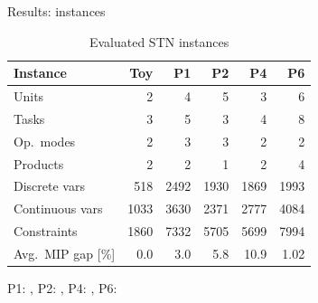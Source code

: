 \documentclass[slides]{beamer}
\begin{document}
\begin{frame}{Results: instances}
    \begin{table}[htb]
        \centering
        \begin{tabular}{l r r r r r}
            \hline
            Instance            & Toy  & P1 & P2   & P4   & P6   \\ \hline
            Units               & 2    & 4    & 5    & 3    & 6    \\
            Tasks               & 3    & 5    & 3    & 4    & 8    \\
            Op.~modes           & 2    & 3    & 3    & 2    & 2    \\
            Products            & 2    & 2    & 1    & 2    & 4    \\ \hline
            Discrete vars       & 518  & 2492 & 1930 & 1869 & 1993 \\
            Continuous vars     & 1033 & 3630 & 2371 & 2777 & 4084 \\
            Constraints         & 1860 & 7332 & 5705 & 5699 & 7994 \\
            Avg.~MIP gap [\%]   & 0.0  & 3.0  & 5.8  & 10.9 & 1.02 \\
            \hline
        \end{tabular}
        \caption{Evaluated STN instances}
        \label{tab:instances}
    \end{table}
    \scriptsize
    P1: \citet{Kondili1993}, P2: \citet{Karimi1997}, P4: \citet{Maravelias2003},
    P6: \citet{Ierapetritou1998}

\end{frame}
\end{document}
